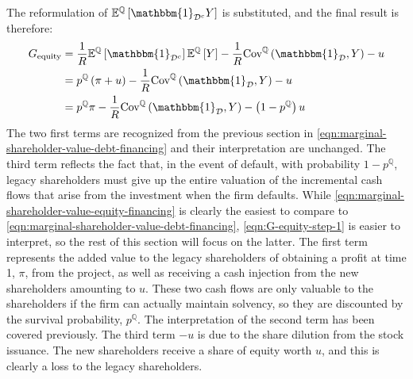 \documentclass[../main.tex]{subfiles}
\begin{document}
        The reformulation of $\mathbb{E}^{\mathbb{Q}}\left[\mathbbm{1}_{\mathcal{D}^{c}} Y\right]$ is substituted, 
        and the final result is therefore:
            \begin{align}
                G_{\text{equity}} &=
                    \discountfactor
                    \mathbb{E}^{\mathbb{Q}}\left[\mathbbm{1}_{\mathcal{D}^{c}}\right]
                    \mathbb{E}^{\mathbb{Q}}\left[Y\right]
                    -
                    \discountfactor
                    \text{Cov}^{\mathbb{Q}}\left(
                        \mathbbm{1}_{\mathcal{D}},
                        Y
                    \right)
                    -
                    u
                    \nonumber \\
                &= 
                    p^{\mathbb{Q}}
                    \left(
                        \pi
                        +
                        u
                    \right)
                    -
                    \discountfactor
                    \text{Cov}^{\mathbb{Q}}\left(
                        \mathbbm{1}_{\mathcal{D}},
                        Y
                    \right)
                    -
                    u 
                    \label{eqn:G-equity-step-1} \\
                &= 
                    p^{\mathbb{Q}}
                    \pi
                    -
                    \discountfactor
                    \text{Cov}^{\mathbb{Q}}\left(
                        \mathbbm{1}_{\mathcal{D}},
                        Y
                    \right)
                    -
                    \left(
                        1
                        -
                        p^{\mathbb{Q}}
                    \right)
                    u 
                \label{eqn:marginal-shareholder-value-equity-financing}
            \end{align}
        The two first terms are recognized from the previous section in 
        \cref{eqn:marginal-shareholder-value-debt-financing}
        and their interpretation are unchanged. 
        The third term reflects the fact that, in the event of default, with probability $1-p^{\mathbb{Q}}$, 
        legacy shareholders must give up the entire valuation of the incremental cash flows
        that arise from the investment when the firm defaults.
        While \cref{eqn:marginal-shareholder-value-equity-financing} is clearly the easiest to compare to 
        \cref{eqn:marginal-shareholder-value-debt-financing},
        \cref{eqn:G-equity-step-1} is easier to interpret, so the rest of this section will focus on the latter.
        The first term represents the added value to the legacy shareholders of 
        obtaining a profit at time 1, $\pi$, from the project,
        as well as receiving a cash injection from the new shareholders amounting to $u$.
        These two cash flows are only valuable to the shareholders if the firm can actually maintain solvency,
        so they are discounted by the survival probability, $p^{\mathbb{Q}}$.
        The interpretation of the second term has been covered previously.
        The third term $-u$ is due to the share dilution from the stock issuance.
        The new shareholders receive a share of equity worth $u$, 
        and this is clearly a loss to the legacy shareholders.
\end{document}
